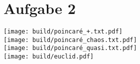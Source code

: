 \section*{Aufgabe 2}
\texttt{[image: build/poincaré\_+.txt.pdf]}\\
\texttt{[image: build/poincaré\_chaos.txt.pdf]}\\
\texttt{[image: build/poincaré\_quasi.txt.pdf]}\\
\texttt{[image: build/euclid.pdf]}

